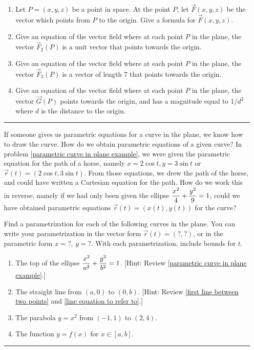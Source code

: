 \begin{problem}
\begin{enumerate}
 \item%
%
Let $P=(x,y,z)$ be a point in space.  At the point $P$, let $\vec F(x,y,z)$ be the vector which points from $P$ to the origin.  Give a formula for $\vec F(x,y,z)$.
 \item Give an equation of the vector field where at each point $P$ in the plane, the vector $\vec F_2(P)$ is a unit vector that points towards the origin.
 \item Give an equation of the vector field where at each point $P$ in the plane, the vector $\vec F_3(P)$ is a vector of length 7 that points towards the origin.
 \item Give an equation of the vector field where at each point $P$ in the plane, the vector $\vec G(P)$ points towards the origin, and has a magnitude equal to $1/d^2$ where $d$ is the distance to the origin.
\end{enumerate}
\hrule\end{problem}

If someone gives us parametric equations for a curve in the plane, we know how to draw the curve.  How do we obtain parametric equations of a given curve? In problem \ref{parametric curve in plane example}, we were given the parametric equation for the path of a horse, namely $x=2\cos t, y=3 \sin t$ or $\vec r(t)=(2\cos t,3\sin t)$. From those equations, we drew the path of the horse, and could have written a Cartesian equation for the path. How do we work this in reverse, namely if we had only been given the ellipse $\displaystyle\frac{x^2}{4}+\frac{y^2}{9}=1$, could we have obtained parametric equations $\vec r(t)=(x(t),y(t))$ for the curve?
\begin{problem}
 Find a parametrization for each of the following curves in the plane. 
 You can write your parametrization in the vector form $\vec r(t)=(?,?)$, or in the parametric form $x=?,\ y=?$. 
 With each parametrization, include bounds for $t$.
\begin{enumerate}
 \item The top of the ellipse $\displaystyle\frac{x^2}{a^2}+\frac{y^2}{b^2}=1$. [Hint: Review \ref{parametric curve in plane example}.]
 \item The straight line from $(a,0)$ to $(0,b)$. [Hint: Review \ref{first line between two points} and \ref{line equation to refer to}.]
 \item The parabola $y=x^2$ from $(-1,1)$ to $(2,4)$.
 \item The function $y=f(x)$ for $x\in[a,b]$.
\end{enumerate}
\hrule\end{problem}

